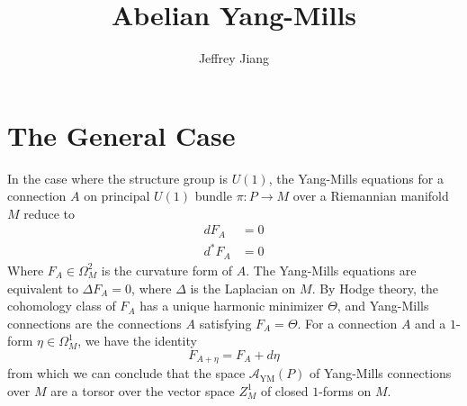 \documentclass[psamsfonts, 12pt]{amsart}
\theoremstyle{definition}
\theoremstyle{remark}
\begin{document}
%
\author{Jeffrey Jiang}
%
\title{Abelian Yang-Mills}
%
\maketitle
%
\tableofcontents
%
\section{The General Case}
%
In the case where the structure group is $U(1)$, the Yang-Mills equations for
a connection $A$ on principal $U(1)$ bundle $\pi : P \to M$ over a Riemannian manifold $M$
reduce to
\begin{align*}
dF_A &= 0 \\
d^*F_A &= 0
\end{align*}
%
Where $F_A \in \Omega^2_M$ is the curvature form of $A$. The Yang-Mills equations are
equivalent to $\Delta F_A = 0$, where $\Delta$ is the Laplacian on $M$. By Hodge theory,
the cohomology class of $F_A$ has a unique harmonic minimizer $\Theta$, and Yang-Mills
connections are the connections $A$ satisfying $F_A = \Theta$. For a
connection $A$ and a $1$-form $\eta \in \Omega^1_M$, we have the identity
\[
F_{A + \eta} = F_A + d\eta
\]
from which we can conclude that the space $\mathscr{A}_{\text{YM}}(P)$ of
Yang-Mills connections over $M$ are a torsor over the vector space
$Z^1_M$ of closed $1$-forms on $M$. \\
\end{document}
